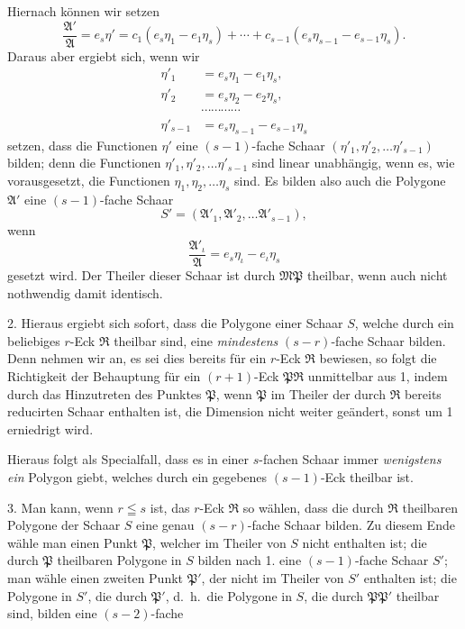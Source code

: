 \documentclass{article}
\begin{document}
Hiernach können wir setzen
\[ \frac{\mathfrak{A}'}{\mathfrak{A}} = e_{s}\eta' = c_{1}(e_{s}\eta_{1} - e_{1}\eta_{s}) + \cdots + c_{s-1}(e_{s}\eta_{s-1} - e_{s-1}\eta_{s}). \]
Daraus aber ergiebt sich, wenn wir
\[ \begin{aligned} \eta'_{1} &= e_{s}\eta_{1} - e_{1}\eta_{s}, \\ \eta'_{2} &= e_{s}\eta_{2} - e_{2}\eta_{s}, \\ &\cdots\cdots\cdots\cdots \\ \eta'_{s-1} &= e_{s}\eta_{s-1} - e_{s-1}\eta_{s} \end{aligned} \]
setzen, dass die Functionen $\eta'$ eine $(s-1)$-fache Schaar $(\eta'_{1}, \eta'_{2}, \ldots \eta'_{s-1})$ bilden; denn die Functionen $\eta'_{1}, \eta'_{2}, \ldots \eta'_{s-1}$ sind linear unabhängig, wenn es, wie vorausgesetzt, die Functionen $\eta_{1}, \eta_{2}, \ldots \eta_{s}$ sind. Es bilden also auch die Polygone $\mathfrak{A}'$ eine $(s-1)$-fache Schaar
\[ S' = (\mathfrak{A}'_{1}, \mathfrak{A}'_{2}, \ldots \mathfrak{A}'_{s-1}), \]
wenn
\[ \frac{\mathfrak{A}'_{\iota}}{\mathfrak{A}} = e_{s}\eta_{\iota} - e_{\iota}\eta_{s} \]
gesetzt wird. Der Theiler dieser Schaar ist durch $\mathfrak{M}\mathfrak{P}$ theilbar, wenn auch nicht nothwendig damit identisch.

2. Hieraus ergiebt sich sofort, dass die Polygone einer Schaar $S$, welche durch ein beliebiges $r$-Eck $\mathfrak{R}$ theilbar sind, eine \emph{mindestens} $(s-r)$-fache Schaar bilden. Denn nehmen wir an, es sei dies bereits für ein $r$-Eck $\mathfrak{R}$ bewiesen, so folgt die Richtigkeit der Behauptung für ein $(r+1)$-Eck $\mathfrak{P}\mathfrak{R}$ unmittelbar aus 1, indem durch das Hinzutreten des Punktes $\mathfrak{P}$, wenn $\mathfrak{P}$ im Theiler der durch $\mathfrak{R}$ bereits reducirten Schaar enthalten ist, die Dimension nicht weiter geändert, sonst um 1 erniedrigt wird.

Hieraus folgt als Specialfall, dass es in einer $s$-fachen Schaar immer \emph{wenigstens ein} Polygon giebt, welches durch ein gegebenes $(s-1)$-Eck theilbar ist.

3. Man kann, wenn $r \leqq s$ ist, das $r$-Eck $\mathfrak{R}$ so wählen, dass die durch $\mathfrak{R}$ theilbaren Polygone der Schaar $S$ eine genau $(s-r)$-fache Schaar bilden. Zu diesem Ende wähle man einen Punkt $\mathfrak{P}$, welcher im Theiler von $S$ nicht enthalten ist; die durch $\mathfrak{P}$ theilbaren Polygone in $S$ bilden nach 1. eine $(s-1)$-fache Schaar $S'$; man wähle einen zweiten Punkt $\mathfrak{P}'$, der nicht im Theiler von $S'$ enthalten ist; die Polygone in $S'$, die durch $\mathfrak{P}'$, d.\ h.\ die Polygone in $S$, die durch $\mathfrak{P}\mathfrak{P}'$ theilbar sind, bilden eine $(s-2)$-fache
\end{document}
